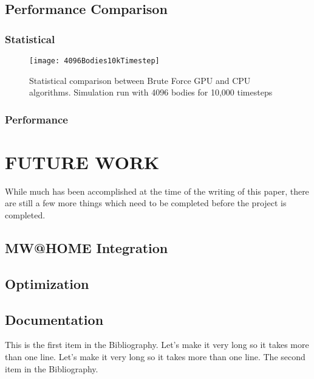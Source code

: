 \documentclass{thesis}
\begin{document}
\section{Performance Comparison}
\subsection{Statistical}
\begin{figure}[h]
    \caption{Statistical comparison between Brute Force GPU and CPU algorithms. Simulation run with 4096 bodies for 10,000 timesteps}
    \label{fig:test}
    \centering
    \texttt{[image: 4096Bodies10kTimestep]}
\end{figure}
\subsection{Performance}

\chapter{FUTURE WORK}
While much has been accomplished at the time of the writing of this paper, there are still a few more things which need to be completed before the project is completed.

\section{MW@HOME Integration}
\section{Optimization}
\section{Documentation}

\begin{singlespace}
\begin{thebibliography}{99}
 This is the first item in the Bibliography.
Let's make it very long so it takes more than one line.
Let's make it very long so it takes more than one line.
 The second item in the Bibliography.
\end{thebibliography}
\end{singlespace}
\end{document}
